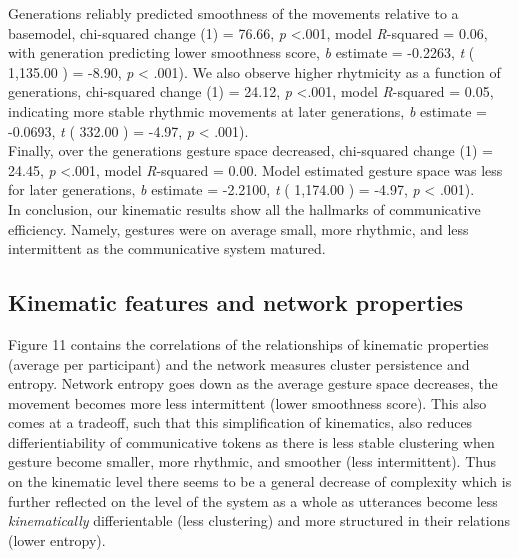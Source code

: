 \documentclass[
  man, noextraspace,floatsintext]{apa6}
\begin{document}
Generations reliably predicted smoothness of the movements relative to a basemodel, chi-squared change (1) = 76.66, \emph{p} \textless.001, model \emph{R}-squared = 0.06, with generation predicting lower smoothness score, \emph{b} estimate = -0.2263, \emph{t} ( 1,135.00 ) = -8.90, \emph{p} \textless{} .001).
We also observe higher rhytmicity as a function of generations, chi-squared change (1) = 24.12, \emph{p} \textless.001, model \emph{R}-squared = 0.05, indicating more stable rhythmic movements at later generations, \emph{b} estimate = -0.0693, \emph{t} ( 332.00 ) = -4.97, \emph{p} \textless{} .001).\\
Finally, over the generations gesture space decreased, chi-squared change (1) = 24.45, \emph{p} \textless.001, model \emph{R}-squared = 0.00. Model estimated gesture space was less for later generations, \emph{b} estimate = -2.2100, \emph{t} ( 1,174.00 ) = -4.97, \emph{p} \textless{} .001).\\
In conclusion, our kinematic results show all the hallmarks of communicative efficiency. Namely, gestures were on average small, more rhythmic, and less intermittent as the communicative system matured.

\hypertarget{kinematic-features-and-network-properties}{%
\subsection{Kinematic features and network properties}\label{kinematic-features-and-network-properties}}

Figure 11 contains the correlations of the relationships of kinematic properties (average per participant) and the network measures cluster persistence and entropy. Network entropy goes down as the average gesture space decreases, the movement becomes more less intermittent (lower smoothness score). This also comes at a tradeoff, such that this simplification of kinematics, also reduces differientiability of communicative tokens as there is less stable clustering when gesture become smaller, more rhythmic, and smoother (less intermittent). Thus on the kinematic level there seems to be a general decrease of complexity which is further reflected on the level of the system as a whole as utterances become less \emph{kinematically} differientable (less clustering) and more structured in their relations (lower entropy).

\pagebreak
\end{document}
